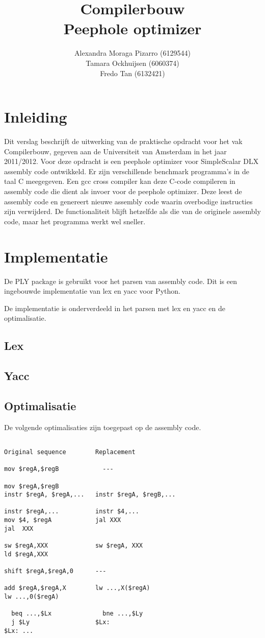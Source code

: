 \documentclass[11pt]{article}
\author{Alexandra Moraga Pizarro (6129544)
      \\Tamara Ockhuijsen (6060374)
      \\Fredo Tan (6132421)}
\title{Compilerbouw
     \\Peephole optimizer}
\begin{document}
\maketitle
\newpage

\section{Inleiding}
Dit verslag beschrijft de uitwerking van de praktische opdracht voor het vak 
Compilerbouw, gegeven aan de Universiteit van Amsterdam in het jaar 2011/2012. 
Voor deze opdracht is een peephole optimizer voor SimpleScalar DLX assembly 
code ontwikkeld. Er zijn verschillende benchmark programma's in de taal C 
meegegeven. Een gcc cross compiler kan deze C-code compileren in assembly code 
die dient als invoer voor de peephole optimizer. Deze leest de assembly code 
en genereert nieuwe assembly code waarin overbodige instructies zijn 
verwijderd. De functionaliteit blijft hetzelfde als die van de originele 
assembly code, maar het programma werkt wel sneller.

\section{Implementatie}
De PLY package is gebruikt voor het parsen van assembly code. Dit is een 
ingebouwde implementatie van lex en yacc voor Python.

De implementatie is onderverdeeld in het parsen met lex en yacc en de 
optimalisatie.
\subsection{Lex}

\subsection{Yacc}

\subsection{Optimalisatie}
De volgende optimalisaties zijn toegepast op de assembly code.
\begin{verbatim}

Original sequence        Replacement

mov $regA,$regB     	   ---

mov $regA,$regB
instr $regA, $regA,...   instr $regA, $regB,...

instr $regA,...          instr $4,...
mov $4, $regA            jal XXX
jal  XXX

sw $regA,XXX             sw $regA, XXX
ld $regA,XXX

shift $regA,$regA,0      ---

add $regA,$regA,X        lw ...,X($regA)
lw ...,0($regA)

  beq ...,$Lx              bne ...,$Ly
  j $Ly                  $Lx:
$Lx: ...

\end{verbatim}
\end{document}
